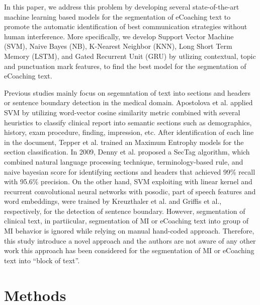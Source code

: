 \documentclass{amia}
\begin{document}
In this paper, we address this problem by developing several state-of-the-art machine learning based models for the segmentation of eCoaching text to promote the automatic identification of best communication strategies without human interference. More specifically, we develop Support Vector Machine (SVM), Naive Bayes (NB), K-Nearest Neighbor (KNN), Long Short Term Memory (LSTM), and Gated Recurrent Unit (GRU) by utlizing contextual, topic and punctuation mark features, to find the best model for the segmentation of eCoaching text. 

Previous studies mainly focus on segemntation of text into sections and headers\cite{apostolova2009automatic,denny2009evaluation,tepper2012statistical,cho2002text} or sentence boundary detection\cite{griffis2016quantitative,kreuzthaler2015detection,treviso2016sentence} in the medical domain. Apostolova et al.\cite{apostolova2009automatic} applied SVM by utilizing word-vector cosine similarity metric combined with several heuristics to classify clinical report into semantic sections such as demographics, history, exam procedure, finding, impression, etc. After identification of each line in the document, Tepper et al. \cite{tepper2012statistical} trained an Maximum Entrophy models for the section classification. In 2009, Denny et al.\cite{denny2009evaluation} proposed a SecTag algorithm, which combined natural language processing technique, terminology-based rule, and naive bayesian score for identifying sections and headers that achieved 99\% recall with 95.6\% precision. On the other hand, SVM exploiting with linear kernel and recurrent convolutional neural networks with posodic, part of speech features and word embeddings, were trained by Kreuzthaler et al.\cite{kreuzthaler2015detection} and Griffis et al.\cite{griffis2016quantitative}, respectively, for the detection of sentence boundary. However, segmentation of clinical text, in partiicular, segmentation of MI or eCoaching text into group of MI behavior is ignored while relying on manual hand-coded approach. Therefore, this study introduce a novel approach and the authors are not aware of any other work this approach has been considered for the segmentation of MI or eCoaching text into ``block of text''. 

\section*{Methods}
\end{document}
